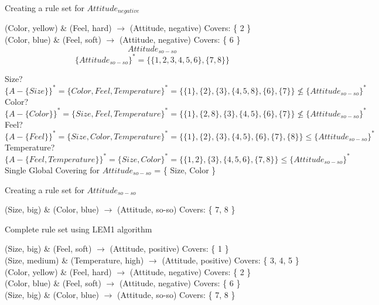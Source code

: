 \documentclass[10pt]{amsart}
\begin{document}
\begin{center}Creating a rule set for $Attitude_{negative}$\end{center}

(Color, yellow) \& (Feel, hard) $\rightarrow$ (Attitude, negative) \qquad Covers: \{ 2 \}\\
(Color, blue) \& (Feel, soft) $\rightarrow$ (Attitude, negative) \qquad Covers: \{ 6 \}\\

$$Attitude_{so-so}$$
$$\{ Attitude_{so-so} \}^* = \{\{1, 2, 3,4, 5, 6 \},\{ 7,8 \}\}$$

Size?  $\{A - \{Size\}\}^* = \{Color, Feel, Temperature\}^* = \{ \{ 1 \}, \{ 2 \}, \{ 3 \}, \{ 4, 5, 8 \}, \{ 6 \}, \{ 7 \} \} \nleq \{ Attitude_{so-so} \}^* $ \\
Color? $\{A - \{Color\}\}^* = \{Size, Feel, Temperature\}^* = \{ \{ 1 \}, \{ 2, 8 \}, \{ 3 \}, \{ 4, 5 \}, \{ 6 \}, \{ 7 \} \} \nleq \{ Attitude_{so-so} \}^* $ \\
Feel? $\{A - \{Feel\}\}^* = \{Size, Color, Temperature\}^* = \{ \{ 1 \}, \{ 2 \}, \{ 3 \}, \{ 4, 5 \}, \{ 6 \}, \{ 7 \}, \{ 8 \}  \} \leq \{ Attitude_{so-so} \}^* $ \\
Temperature? $\{A - \{Feel, Temperature\}\}^* = \{Size, Color\}^* = \{ \{ 1, 2 \}, \{ 3 \}, \{ 4, 5, 6 \}, \{ 7, 8 \} \} \leq \{ Attitude_{so-so} \}^* $ \\

Single Global Covering for $Attitude_{so-so}$ = \{ Size, Color \}

\begin{center}Creating a rule set for $Attitude_{so-so}$\end{center}

(Size, big) \& (Color, blue) $\rightarrow$ (Attitude, so-so) \qquad Covers: \{ 7, 8 \}\\

\begin{center}Complete rule set using LEM1 algorithm\end{center}
(Size, big) \& (Feel, soft) $\rightarrow$ (Attitude, positive) \qquad Covers: \{ 1 \}\\
(Size, medium) \& (Temperature, high) $\rightarrow$ (Attitude, positive) \qquad Covers: \{ 3, 4, 5 \} \\
(Color, yellow) \& (Feel, hard) $\rightarrow$ (Attitude, negative) \qquad Covers: \{ 2 \}\\
(Color, blue) \& (Feel, soft) $\rightarrow$ (Attitude, negative) \qquad Covers: \{ 6 \}\\
(Size, big) \& (Color, blue) $\rightarrow$ (Attitude, so-so) \qquad Covers: \{ 7, 8 \}\\
\end{document}
